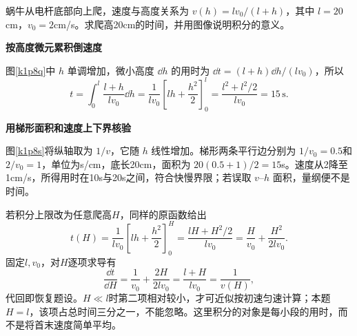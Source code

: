\begin{question}\begin{example}[速度随高度变化的爬行]\label{k1p8}
蜗牛从电杆底部向上爬，速度与高度关系为 $v(h)=lv_0/(l+h)$，其中 $l=20$cm，$v_0=2$cm/s。求爬高20cm的时间，并用图像说明积分的意义。\end{example}
\end{question}
\begin{solution}\textbf{按高度微元累积倒速度}\par\nobreak
图\ref{k1p8q}中 $h$ 单调增加，微小高度 $\dd h$ 的用时为 $\dd t=(l+h)\dd h/(lv_0)$，所以
\[t=\int_0^l\frac{l+h}{lv_0}\dd h
 =\frac1{lv_0}\left[lh+\frac{h^2}{2}\right]_0^l
 =\frac{l^2+l^2/2}{lv_0}=\boxed{15\,\mathrm s}.\]



\par\medskip{}\noindent\textbf{用梯形面积和速度上下界核验}\par\nobreak
图\ref{k1p8s}将纵轴取为 $1/v$，它随 $h$ 线性增加。梯形两条平行边分别为 $1/v_0=0.5$和 $2/v_0=1$，单位为s/cm，底长20cm，面积为 $20(0.5+1)/2=15$s。速度从2降至1cm/s，所得用时在10s与20s之间，符合快慢界限；若误取 $v$--$h$ 面积，量纲便不是时间。

若积分上限改为任意爬高$H$，同样的原函数给出
\[
t(H)=\frac1{lv_0}\left[lh+\frac{h^2}{2}\right]_0^H
=\frac{lH+H^2/2}{lv_0}
=\frac H{v_0}+\frac{H^2}{2lv_0}.
\]
固定$l,v_0$，对$H$逐项求导有
\[
\frac{\dd t}{\dd H}=\frac1{v_0}+\frac{2H}{2lv_0}
=\frac{l+H}{lv_0}=\frac1{v(H)},
\]
代回即恢复题设。$H\ll l$时第二项相对较小，才可近似按初速匀速计算；本题$H=l$，该项占总时间三分之一，不能忽略。这里积分的对象是每小段的用时，而不是将首末速度简单平均。



\end{solution}
